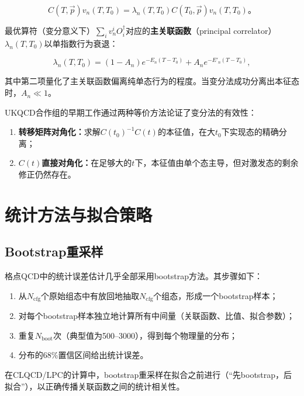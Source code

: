 \documentclass[12pt,a4paper]{ctexart}
\theoremstyle{definition}
\begin{document}
\begin{equation}
\boxed{C(T, \vec{p}) v_n(T, T_0) = \lambda_n(T, T_0) C(T_0, \vec{p}) v_n(T, T_0)}。
\label{eq:GEVP}
\end{equation}

最优算符（变分意义下）$\sum_i v^i_n O^\dagger_i$对应的\textbf{主关联函数}（principal correlator）$\lambda_n(T, T_0)$以单指数行为衰退：

\begin{equation}
\lambda_n(T, T_0) = (1 - A_n) e^{-E_n(T-T_0)} + A_n e^{-E'_n(T-T_0)},
\label{eq:principal_correlator}
\end{equation}

其中第二项量化了主关联函数偏离纯单态行为的程度。当变分法成功分离出本征态时，$A_n \ll 1$。

UKQCD合作组的早期工作\cite{UKQCD1993}通过两种等价方法论证了变分法的有效性：
\begin{enumerate}
    \item \textbf{转移矩阵对角化：}求解$C(t_0)^{-1}C(t)$的本征值，在大$t_0$下实现态的精确分离；
    \item \textbf{$C(t)$直接对角化：}在足够大的$t$下，本征值由单个态主导，但对激发态的剩余修正仍然存在。
\end{enumerate}

\section{统计方法与拟合策略}

\subsection{Bootstrap重采样}

格点QCD中的统计误差估计几乎全部采用bootstrap方法\cite{Chen2025gluon,UKQCD1993}。其步骤如下：

\begin{enumerate}
    \item 从$N_{\text{cfg}}$个原始组态中有放回地抽取$N_{\text{cfg}}$个组态，形成一个bootstrap样本；
    \item 对每个bootstrap样本独立地计算所有中间量（关联函数、比值、拟合参数）；
    \item 重复$N_{\text{boot}}$次（典型值为500--3000），得到每个物理量的分布；
    \item 分布的68\%置信区间给出统计误差。
\end{enumerate}

在CLQCD/LPC的计算中\cite{Chen2025gluon}，bootstrap重采样在拟合之前进行（``先bootstrap，后拟合''），以正确传播关联函数之间的统计相关性。
\end{document}
